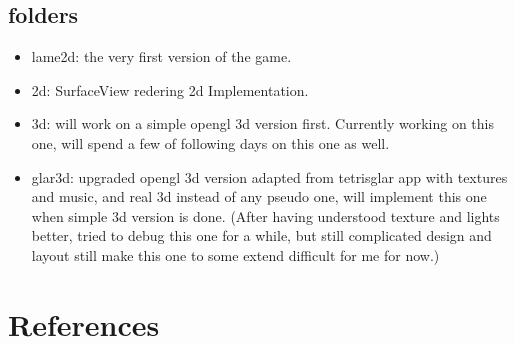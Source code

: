 \documentclass[9pt,b5paper]{article}
\begin{document}
\subsection{folders}
\label{sec-1-2}
\begin{itemize}
\item lame2d: the very first version of the game.
\item 2d: SurfaceView redering 2d Implementation.
\item 3d: will work on a simple opengl 3d version first. Currently working on this one, will spend a few of following days on this one as well.
\item glar3d: upgraded opengl 3d version adapted from tetrisglar app with textures and music, and real 3d instead of any pseudo one, will implement this one when simple 3d version is done. (After having understood texture and lights better, tried to debug this one for a while, but still complicated design and layout still make this one to some extend difficult for me for now.)
\end{itemize}

\section{References}
\label{sec-2}
\end{document}
